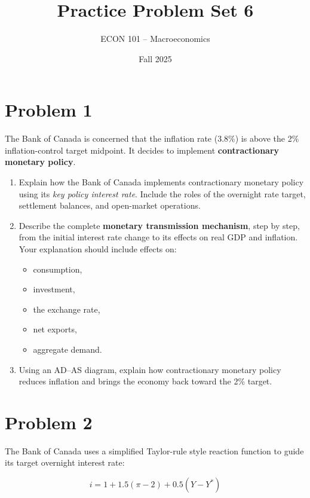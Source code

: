 \documentclass[12pt]{article}
\title{Practice Problem Set 6}
\author{ECON 101 -- Macroeconomics}
\date{Fall 2025}
\begin{document}
\maketitle

\section*{Problem 1}

The Bank of Canada is concerned that the inflation rate (3.8\%) is above the 2\% inflation-control target midpoint. 
It decides to implement \textbf{contractionary monetary policy}.



\begin{enumerate}
    \item[(a)] Explain how the Bank of Canada implements contractionary monetary policy using its \emph{key policy interest rate}. 
    Include the roles of the overnight rate target, settlement balances, and open-market operations.
    
    \item[(b)] Describe the complete \textbf{monetary transmission mechanism}, step by step, from the initial interest rate change to its effects on real GDP and inflation. 
    Your explanation should include effects on:
    \begin{itemize}
        \item consumption,
        \item investment,
        \item the exchange rate,
        \item net exports,
        \item aggregate demand.
    \end{itemize}
    
    \item[(c)] Using an AD--AS diagram, explain how contractionary monetary policy reduces inflation and brings the economy back toward the 2\% target.
\end{enumerate}

\newpage

\section*{Problem 2}

The Bank of Canada uses a simplified Taylor-rule style reaction function to guide its target overnight interest rate:

\[
i = 1 + 1.5(\pi - 2) + 0.5(Y - Y^*)
\]
\end{document}
